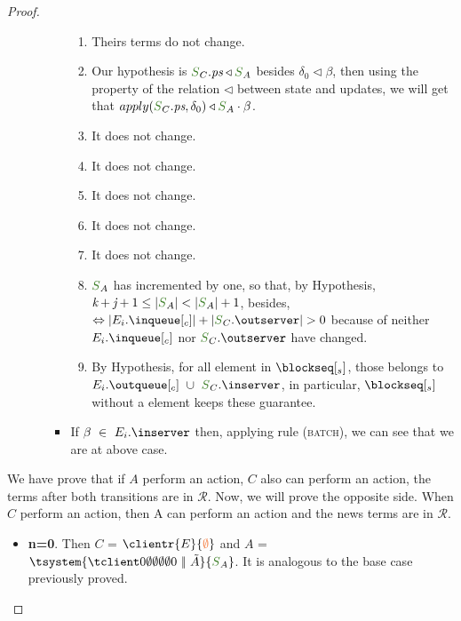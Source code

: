 \begin{proof}
\begin{itemize}
\begin{itemize}
\begin{itemize}
						\begin{enumerate}
							\item Theirs terms do not change.
							\item Our hypothesis is $\queuemessage_C.\state \triangleleft \queuemessage_A$ besides $\delta_0 \triangleleft \beta$, then using the property of the relation $\triangleleft$ between state and updates, we will get that $apply(\queuemessage_C.\state,\delta_0) \triangleleft \queuemessage_A \cdot \beta$.
							\item It does not change.
							\item It does not change.
							\item It does not change.
							\item It does not change.
							\item It does not change.
							\item $\queuemessage_A$  has incremented by one, so that, by Hypothesis, $\tknown + \treceivebuffer + 1 \leq |\queuemessage_A| < |\queuemessage_A| + 1$, besides, $\Leftrightarrow |E_{i}.\inclient| + |\queuemessage_C.\outserver| > 0$ because of neither $E_{i}.\inclient$ nor $\queuemessage_C.\outserver$ have changed.
\item By Hypothesis, for all element in $\tsent$, those belongs to $E_{i}.\outclient \ \cup \ \queuemessage_C.\inserver$, in particular, $\tsent$ without a element keeps these guarantee.
						\end{enumerate}
\item If $\beta \ \in\ E_{i}.\inserver$ then, applying rule (\textsc{\footnotesize{batch}}), we can see that we are at above case.
					\end{itemize}
					
\end{itemize}

\end{itemize}

We have prove that if $A$ perform an action, $C$ also can perform an action, the terms after both transitions are in $\mathcal{R}$. Now, we will prove the opposite side. When $C$ perform an action, then A can perform an action and the news terms are in $\mathcal{R}$.


\begin{itemize}
   \item{\bf n=0}. Then $C$ = $\clientr{E}{\initialstate}$ and $A$ = $\tsystem{\tclienti{0}{\emptyset}{\emptyset}{\emptyset}{\emptyset}{0}\ \bigpar\ \tilde{A}}{\queuemessage_A}$. It is analogous to the base case previously proved.
			

\end{itemize}
\end{proof}
